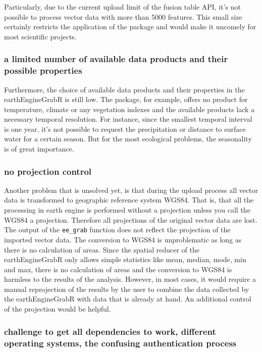 Particularly, due to the current upload limit of the fusion table API, it's not possible to process vector data with more than 5000 features. This small size certainly restricts the application of the package and would make it uncomely for most scientific projects. 

\subsubsection{a limited number of available data products and their possible properties}

Furthermore, the choice of available data products and their properties in the earthEngineGrabR is still low. The package, for example, offers no product for temperature, climate or any vegetation indexes and the available products lack a necessary temporal resolution. For instance, since the smallest temporal interval is one year, it's not possible to request the precipitation or distance to surface water for a certain season. But for the most ecological problems, the seasonality is of great importance.


\subsubsection{no projection control}

Another problem that is unsolved yet, is that during the upload process all vector data is transformed to geographic reference system WGS84. That is, that all the processing in earth engine is performed without a projection unless you call the WGS84 a projection. Therefore all projections of the original vector data are lost. The output of the \texttt{ee\_grab} function does not reflect the projection of the imported vector data. The conversion to WGS84 is unproblematic as long as there is no calculation of areas. Since the spatial reducer of the earthEngineGrabR only allows simple statistics like mean, median, mode, min and max, there is no calculation of areas and the conversion to WGS84 is harmless to the results of the analysis. However, in most cases, it would require a manual reprojection of the results by the user to combine the data collected by the earthEngineGrabR with data that is already at hand. An additional control of the projection would be helpful.

\subsubsection{challenge to get all dependencies to work, different operating systems, the confusing authentication process}



